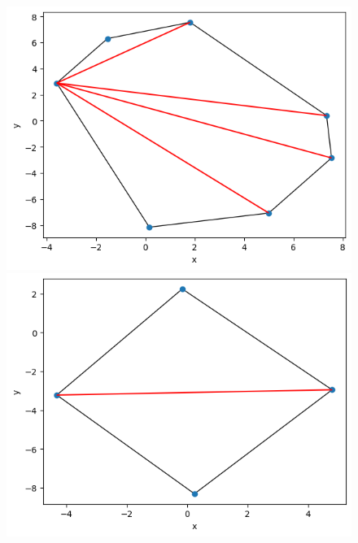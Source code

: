 \documentclass[11pt]{scrartcl}
\begin{document}
    \begin{figure}[H]
        \centering
        \begin{minipage}{0.45\linewidth}
          \centering
          \includegraphics[width=1\linewidth]{3_5.png}
          \caption{}
        \end{minipage}
        \begin{minipage}{0.45\linewidth}
          \centering
          \includegraphics[width=1\linewidth]{3_6.png}
          \caption{}
        \end{minipage}
    \end{figure}
\end{document}
